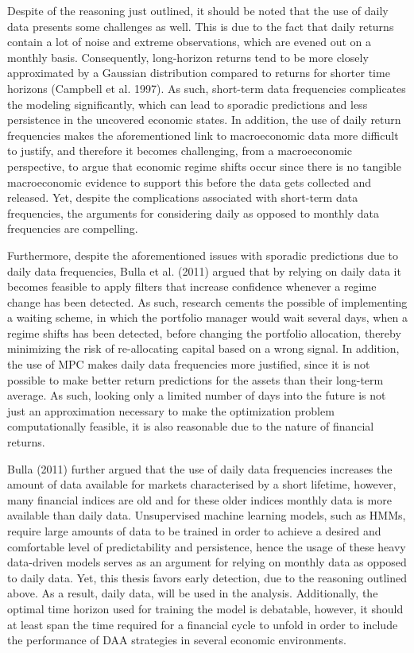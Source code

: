 Despite of the reasoning just outlined, it should be noted that the use of daily data presents some challenges as well. This is due to the fact that daily returns contain a lot of noise and extreme observations, which are evened out on a monthly basis. Consequently, long-horizon returns tend to be more closely approximated by a Gaussian distribution compared to returns for shorter time horizons (Campbell et al. 1997). As such, short-term data frequencies complicates the modeling significantly, which can lead to sporadic predictions and less persistence in the uncovered economic states. In addition, the use of daily return frequencies makes the aforementioned link to macroeconomic data more difficult to justify, and therefore it becomes challenging, from a macroeconomic perspective, to argue that economic regime shifts occur since there is no tangible macroeconomic evidence to support this before the data gets collected and released. Yet, despite the complications associated with short-term data frequencies, the arguments for considering daily as opposed to monthly data frequencies are compelling. 

Furthermore, despite the aforementioned issues with sporadic predictions due to daily data frequencies, Bulla et al. (2011) argued that by relying on daily data it becomes feasible to apply filters that increase confidence whenever a regime change has been detected. As such, research cements the possible of implementing a waiting scheme, in which the portfolio manager would wait several days, when a regime shifts has been detected, before changing the portfolio allocation, thereby minimizing the risk of re-allocating capital based on a wrong signal. In addition, the use of MPC makes daily data frequencies more justified, since it is not possible to make better return predictions for the assets than their long-term average. As such, looking only a limited number of days into the future is not just an approximation necessary to make the optimization problem computationally feasible, it is also reasonable due to the nature of financial returns.

Bulla (2011) further argued that the use of daily data frequencies increases the amount of data available for markets characterised by a short lifetime, however, many financial indices are old and for these older indices monthly data is more available than daily data. Unsupervised machine learning models, such as HMMs, require large amounts of data to be trained in order to achieve a desired and comfortable level of predictability and persistence, hence the usage of these heavy data-driven models serves as an argument for relying on monthly data as opposed to daily data. Yet, this thesis favors early detection, due to the reasoning outlined above. As a result, daily data, will be used in the analysis. Additionally, the optimal time horizon used for training the model is debatable, however, it should at least span the time required for a financial cycle to unfold in order to include the performance of DAA strategies in several economic environments. 

